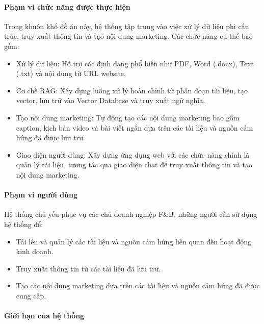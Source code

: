 \paragraph{Phạm vi chức năng được thực
hiện}\label{phux1ea1m-vi-chux1ee9c-nux103ng-ux111ux1b0ux1ee3c-thux1ef1c-hiux1ec7n}

Trong khuôn khổ đồ án này, hệ thống tập trung vào việc xử lý dữ liệu phi
cấu trúc, truy xuất thông tin và tạo nội dung marketing. Các chức năng
cụ thể bao gồm:

\begin{itemize}
\item
  Xử lý dữ liệu: Hỗ trợ các định dạng phổ biến như PDF, Word (.docx),
  Text (.txt) và nội dung từ URL website.
\item
  Cơ chế RAG: Xây dựng luồng xử lý hoàn chỉnh từ phân đoạn tài liệu, tạo
  vector, lưu trữ vào Vector Database và truy xuất ngữ nghĩa.
\item
  Tạo nội dung marketing: Tự động tạo các nội dung marketing bao gồm
  caption, kịch bản video và bài viết ngắn dựa trên các tài liệu và
  nguồn cảm hứng đã được lưu trữ.
\item
  Giao diện người dùng: Xây dựng ứng dụng web với các chức năng chính là
  quản lý tài liệu, tương tác qua giao diện chat để truy xuất thông tin
  và tạo nội dung marketing.
\end{itemize}

\paragraph{Phạm vi người
dùng}\label{phux1ea1m-vi-ngux1b0ux1eddi-duxf9ng}

Hệ thống chủ yếu phục vụ các chủ doanh nghiệp F\&B, những người cần sử
dụng hệ thống để:

\begin{itemize}
\item
  Tải lên và quản lý các tài liệu và nguồn cảm hứng liên quan đến hoạt
  động kinh doanh.
\item
  Truy xuất thông tin từ các tài liệu đã lưu trữ.
\item
  Tạo các nội dung marketing dựa trên các tài liệu và nguồn cảm hứng đã
  được cung cấp.
\end{itemize}

\paragraph{Giới hạn của hệ
thống}\label{giux1edbi-hux1ea1n-cux1ee7a-hux1ec7-thux1ed1ng}

